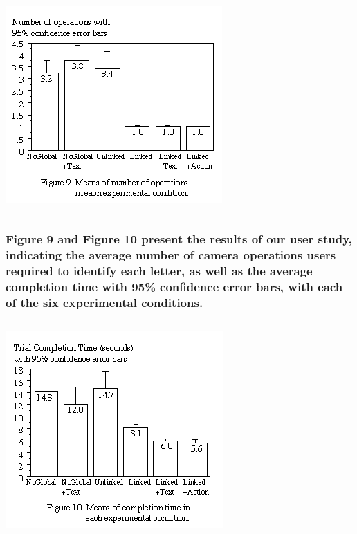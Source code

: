 \documentclass{beamer}
\begin{document}
\begin{frame}
\frametitle{}


\begin{columns}

\centerline{\includegraphics[width=0.500000\linewidth,keepaspectratio]{ky_fg9.png}}

\end{columns}

\end{frame}

\begin{frame}
\frametitle{Figure 9 and Figure 10 present the results of our user study, indicating the average number of camera operations users required to identify each letter, as well as the average completion time with 95\% confidence error bars, with each of the six experimental conditions.}


\begin{columns}

\centerline{\includegraphics[width=0.500000\linewidth,keepaspectratio]{ky_fg10.png}}

\end{columns}

\end{frame}
\end{document}
